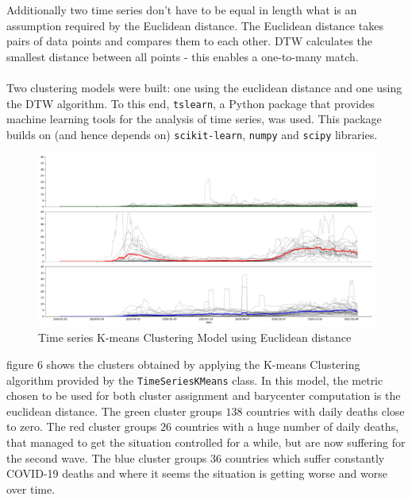 \documentclass[11pt,a4paper]{article}
\begin{document}
\noindent Additionally two time series don't have to be equal in length what is
an assumption required by the Euclidean distance. The Euclidean distance takes
pairs of data points and compares them to each other. DTW calculates the
smallest distance between all points - this enables a one-to-many match.\\
\\
Two clustering models were built: one using the euclidean distance and one using
the DTW algorithm. To this end, \texttt{tslearn}, a Python package that provides
machine learning tools for the analysis of time series, was used. This package
builds on (and hence depends on) \texttt{scikit-learn}, \texttt{numpy} and
\texttt{scipy} libraries.
\begin{figure}[H]
    \begin{center}
        \includegraphics[scale=0.32]{img/daily-deaths-euclidean-clusters.pdf}
    \end{center}
    \caption{Time series K-means Clustering Model using Euclidean distance}
\end{figure}
\noindent figure 6 shows the clusters obtained by applying the K-means
Clustering algorithm provided by the \texttt{TimeSeriesKMeans} class. In this
model, the metric chosen to be used for both cluster assignment and barycenter
computation is the euclidean distance.
The {\color{ForestGreen}green cluster} groups $138$ countries with daily deaths
close to zero. The {\color{red}red cluster} groups $26$ countries with a huge
number of daily deaths, that managed to get the situation controlled for a
while, but are now suffering for the second wave. The {\color{blue}blue cluster}
groups $36$ countries which suffer constantly COVID-19 deaths and where it seems
the situation is getting worse and worse over time.
\end{document}
